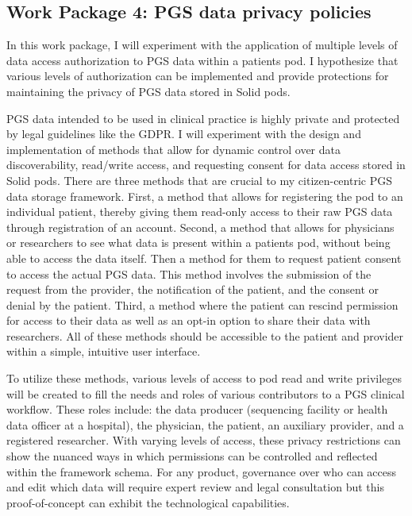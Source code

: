 \documentclass[runningheads]{llncs}
\begin{document}
\subsection{Work Package 4: PGS data privacy policies}

In this work package, I will experiment with the application of multiple levels of data access authorization to PGS data within a patient\textquotesingle s pod. I hypothesize that various levels of authorization can be implemented and provide protections for maintaining the privacy of PGS data stored in Solid pods.

PGS data intended to be used in clinical practice is highly private and protected by legal guidelines like the GDPR. 
I will experiment with the design and implementation of methods that allow for dynamic control over data discoverability, read/write access, and requesting consent for data access stored in Solid pods.
There are three methods that are crucial to my citizen-centric PGS data storage framework.
First, a method that allows for registering the pod to an individual patient, thereby giving them read-only access to their raw PGS data through registration of an account.
Second, a method that allows for physicians or researchers to see what data is present within a patient\textquotesingle s pod, without being able to access the data itself. 
Then a method for them to request patient consent to access the actual PGS data. 
This method involves the submission of the request from the provider, the notification of the patient, and the consent or denial by the patient.
Third, a method where the patient can rescind permission for access to their data as well as an opt-in option to share their data with researchers. 
All of these methods should be accessible to the patient and provider within a simple, intuitive user interface.

To utilize these methods, various levels of access to pod read and write privileges will be created to fill the needs and roles of various contributors to a PGS clinical workflow. 
These roles include: the data producer (sequencing facility or health data officer at a hospital), the physician, the patient, an auxiliary provider, and a registered researcher.
With varying levels of access, these privacy restrictions can show the nuanced ways in which permissions can be controlled and reflected within the framework schema.
For any product, governance over who can access and edit which data will require expert review and legal consultation but this proof-of-concept can exhibit the technological capabilities. 
\end{document}
